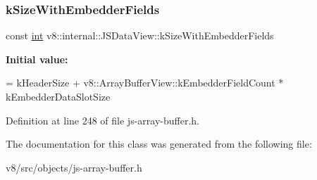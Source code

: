 \subsubsection{\texorpdfstring{k\+Size\+With\+Embedder\+Fields}{kSizeWithEmbedderFields}}
{\footnotesize\ttfamily const \mbox{\hyperlink{classint}{int}} v8\+::internal\+::\+J\+S\+Data\+View\+::k\+Size\+With\+Embedder\+Fields\hspace{0.3cm}{\ttfamily [static]}}

{\bfseries Initial value\+:}
\begin{DoxyCode}
=
      kHeaderSize +
      v8::ArrayBufferView::kEmbedderFieldCount * kEmbedderDataSlotSize
\end{DoxyCode}


Definition at line 248 of file js-\/array-\/buffer.\+h.



The documentation for this class was generated from the following file\+:\begin{DoxyCompactItemize}
\item 
v8/src/objects/js-\/array-\/buffer.\+h\end{DoxyCompactItemize}
